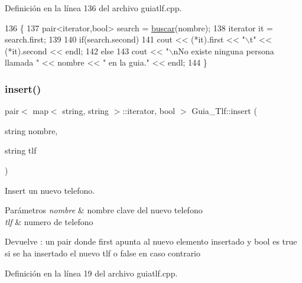 Definición en la línea 136 del archivo guiatlf.\+cpp.


\begin{DoxyCode}
136                                                   \{
137             pair<iterator,bool> search = \hyperlink{classGuia__Tlf_afe54faba93b8cd891cc150b9d8c9dbd5}{buscar}(nombre);
138             iterator it = search.first;
139             
140             \textcolor{keywordflow}{if}(search.second)
141                 cout << (*it).first << \textcolor{stringliteral}{"\(\backslash\)t"} << (*it).second << endl;
142             \textcolor{keywordflow}{else}
143                 cout << \textcolor{stringliteral}{"\(\backslash\)nNo existe ninguna persona llamada "} << nombre << \textcolor{stringliteral}{" en la guia."} << endl;
144  \}
\end{DoxyCode}
\mbox{\label{classGuia__Tlf_add78a6fe5e8090ad6f71bbb160b70f77}} 
\subsubsection{\texorpdfstring{insert()}{insert()}\hspace{0.1cm}{\footnotesize\ttfamily [1/2]}}
{\footnotesize\ttfamily pair$<$ map$<$ string, string $>$\+::iterator, bool $>$ Guia\+\_\+\+Tlf\+::insert (\begin{DoxyParamCaption}\item[{string}]{nombre,  }\item[{string}]{tlf }\end{DoxyParamCaption})}



Insert un nuevo telefono. 


\begin{DoxyParams}{Parámetros}
{\em nombre} & nombre clave del nuevo telefono \\
\hline
{\em tlf} & numero de telefono \\
\hline
\end{DoxyParams}
\begin{DoxyReturn}{Devuelve}
\+: un pair donde first apunta al nuevo elemento insertado y bool es true si se ha insertado el nuevo tlf o false en caso contrario 
\end{DoxyReturn}


Definición en la línea 19 del archivo guiatlf.\+cpp.



